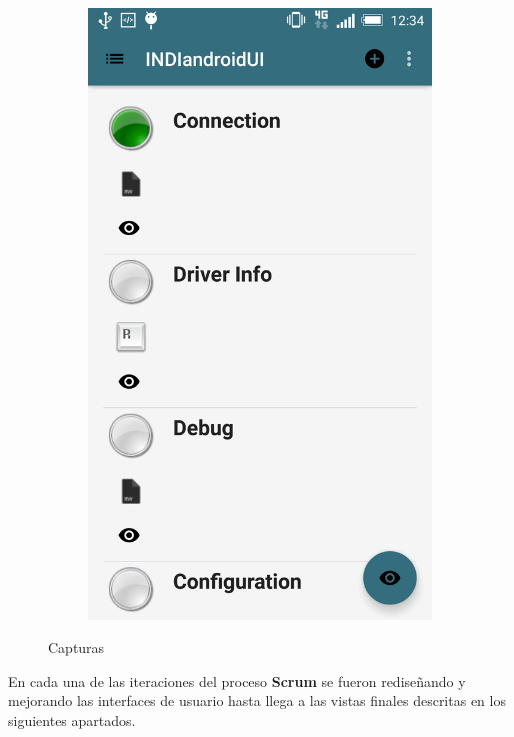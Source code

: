 \begin{figure}
\begin{subfigure}[]{0.4\textwidth}
        \includegraphics[width=\textwidth]{../images/captura5.png}
        \caption{}
        \label{fig:captura4}
    \end{subfigure}
    \caption{Capturas}\label{fig:capturas2}
\end{figure}

\bigskip
En cada una de las iteraciones del proceso \textbf{Scrum} se fueron rediseñando y mejorando las interfaces de usuario hasta llega a las vistas finales descritas en los siguientes apartados.

